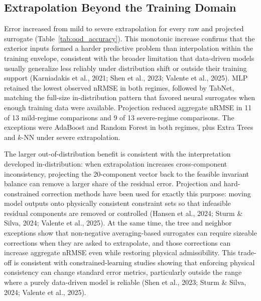 \documentclass[a4paper,fleqn]{cas-sc}
\begin{document}
\subsection{Extrapolation Beyond the Training Domain}

Error increased from mild to severe extrapolation for every raw and projected surrogate (Table~\ref{tab:ood_accuracy}). This monotonic increase confirms that the exterior inputs formed a harder predictive problem than interpolation within the training envelope, consistent with the broader limitation that data-driven models usually generalize less reliably under distribution shift or outside their training support (Karniadakis et al., 2021; Shen et al., 2023; Valente et al., 2025). MLP retained the lowest observed nRMSE in both regimes, followed by TabNet, matching the full-size in-distribution pattern that favored neural surrogates when enough training data were available. Projection reduced aggregate nRMSE in 11 of 13 mild-regime comparisons and 9 of 13 severe-regime comparisons. The exceptions were AdaBoost and Random Forest in both regimes, plus Extra Trees and $k$-NN under severe extrapolation.

The larger out-of-distribution benefit is consistent with the interpretation developed in-distribution: when extrapolation increases cross-component inconsistency, projecting the 20-component vector back to the feasible invariant balance can remove a larger share of the residual error. Projection and hard-constrained correction methods have been used for exactly this purpose: moving model outputs onto physically consistent constraint sets so that infeasible residual components are removed or controlled (Hansen et al., 2024; Sturm \& Silva, 2024; Valente et al., 2025). At the same time, the tree and neighbor exceptions show that non-negative averaging-based surrogates can require sizeable corrections when they are asked to extrapolate, and those corrections can increase aggregate nRMSE even while restoring physical admissibility. This trade-off is consistent with constrained-learning studies showing that enforcing physical consistency can change standard error metrics, particularly outside the range where a purely data-driven model is reliable (Shen et al., 2023; Sturm \& Silva, 2024; Valente et al., 2025).
\end{document}
